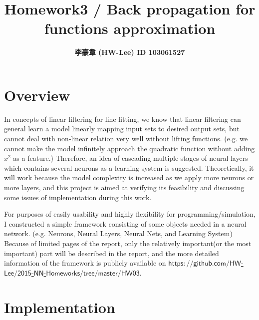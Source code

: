 \documentclass[12pt]{article}
\title{\textbf{Homework3 / Back propagation for functions approximation}}
\author{\textbf{李豪韋 (HW-Lee) ID 103061527}}
\date{}
\begin{document}
\vspace*{-60pt}
    {\let\newpage\relax\maketitle}

\section*{Overview}
\vspace{-20pt}
\noindent\makebox[\linewidth]{\rule{\textwidth}{0.4pt}}
\vspace{5pt}

In concepts of linear filtering for line fitting, we know that linear filtering can general learn a model linearly mapping input sets to desired output sets, but cannot deal with non-linear relation very well without lifting functions. (e.g. we cannot make the model infinitely approach the quadratic function without adding $x^2$ as a feature.) Therefore, an idea of cascading multiple stages of neural layers which contains several neurons as a learning system is suggested. Theoretically, it will work because the model complexity is increased as we apply more neurons or more layers, and this project is aimed at verifying its feasibility and discussing some issues of implementation during this work.

For purposes of easily usability and highly flexibility for programming/simulation, I constructed a simple framework consisting of some objects needed in a neural network. (e.g. Neurons, Neural Layers, Neural Nets, and Learning System) Because of limited pages of the report, only the relatively important(or the most important) part will be described in the report, and the more detailed information of the framework is publicly available on \href{https://github.com/HW-Lee/2015-NN-Homeworks/tree/master/HW03}{$\mathsf{https://github.com/HW}$-$\mathsf{Lee/2015}$-$\mathsf{NN}$-$\mathsf{Homeworks/tree/master/HW03}$}.

\section*{Implementation}
\vspace{-20pt}
\noindent\makebox[\linewidth]{\rule{\textwidth}{0.4pt}}
\end{document}

